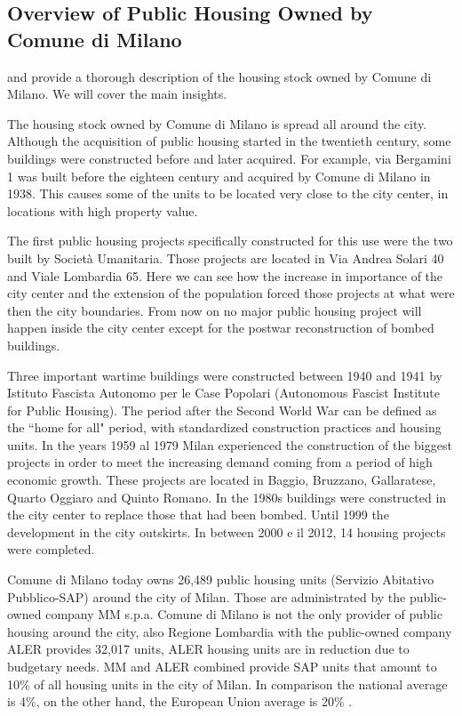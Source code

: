 \documentclass[12pt]{article}
\begin{document}
\subsection{Overview of Public Housing Owned by Comune di Milano}
\label{desc}

\cite{breda_tua_2016} and \cite{Breda} provide a thorough description of the housing stock owned by Comune di Milano. We will cover the main insights. 

The housing stock owned by Comune di Milano is spread all around the city. Although the acquisition of public housing started in the twentieth century, some buildings were constructed before and later acquired. For example, via Bergamini 1 was built before the eighteen century and acquired by Comune di Milano in 1938. This causes some of the units to be located very close to the city center, in locations with high property value. 

The first public housing projects specifically constructed for this use were the two built by Società Umanitaria. Those projects are located in Via Andrea Solari 40 and Viale Lombardia 65. Here we can see how the increase in importance of the city center and the extension of the population forced those projects at what were then the city boundaries. From now on no major public housing project will happen inside the city center except for the postwar reconstruction of bombed buildings.

Three important wartime buildings were constructed between 1940 and 1941 by Istituto Fascista Autonomo per le Case Popolari (Autonomous Fascist Institute for Public Housing). The period after the Second World War can be defined as the ``home for all"  period, with standardized construction practices and housing units. In the years 1959 al 1979 Milan experienced the construction of the biggest projects in order to meet the increasing demand coming from a period of high economic growth. These projects are located in Baggio, Bruzzano, Gallaratese, Quarto Oggiaro and Quinto Romano. In the 1980s buildings were constructed in the city center to replace those that had been bombed. Until 1999 the development in the city outskirts. In between  2000 e il 2012, 14 housing projects were completed. 

Comune di Milano today owns 26,489  public housing units (Servizio
Abitativo Pubblico-SAP) around the city of Milan. Those are administrated by the public-owned company MM s.p.a. Comune di Milano is not the only provider of public housing around the city, also Regione Lombardia with the public-owned company ALER provides 32,017 units, ALER housing units are in reduction due to budgetary needs. MM and ALER combined provide SAP units that amount to 10\% of all housing units in the city of Milan. In comparison the national average is 4\%, on the other hand, the European Union average is 20\% \parencite{comune2023}.
\end{document}
